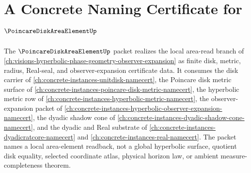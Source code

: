 \chapter{A Concrete Naming Certificate for $\PoincareDiskAreaElementUp$}
\label{ch:concrete-instances-poincare-disk-area-element-namecert}

The $\PoincareDiskAreaElementUp$ packet realizes the local area-read branch of \autoref{ch:visions-hyperbolic-phase-geometry-observer-expansion} as finite disk, metric, radius, Real-seal, and observer-expansion certificate data. It consumes the disk carrier of \autoref{ch:concrete-instances-unitdisk-namecert}, the Poincare disk metric surface of \autoref{ch:concrete-instances-poincare-disk-metric-namecert}, the hyperbolic metric row of \autoref{ch:concrete-instances-hyperbolic-metric-namecert}, the observer-expansion packet of \autoref{ch:concrete-instances-hyperbolic-observer-expansion-namecert}, the dyadic shadow cone of \autoref{ch:concrete-instances-dyadic-shadow-cone-namecert}, and the dyadic and Real substrate of \autoref{ch:concrete-instances-dyadicratcore-namecert} and \autoref{ch:concrete-instances-real-namecert}. The packet names a local area-element readback, not a global hyperbolic surface, quotient disk equality, selected coordinate atlas, physical horizon law, or ambient measure-completeness theorem.

